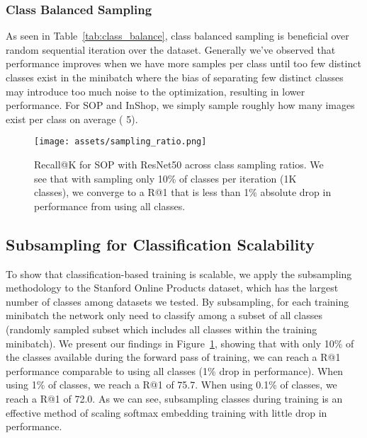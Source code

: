 \documentclass{bmvc2k}
\begin{document}
\subsubsection{Class Balanced Sampling}
\label{sec:class_balance_exp}
 As seen in Table~\ref{tab:class_balance}, class balanced sampling is beneficial over random sequential iteration over the dataset. Generally we've observed that performance improves when we have more samples per class until too few distinct classes exist in the minibatch where the bias of separating few distinct classes may introduce too much noise to the optimization, resulting in lower performance. For SOP and InShop, we simply sample roughly how many images exist per class on average ( 5).



  \begin{figure}
 \centering
 \texttt{[image: assets/sampling\_ratio.png]}
 \caption{Recall@K for SOP with ResNet50 across class sampling ratios. We see that with sampling only 10\% of classes per iteration (1K classes), we converge to a R@1 that is less than 1\% absolute drop in performance from using all classes.}
  \label{fig:sampling_ratio}
 \end{figure}

\subsection{Subsampling for Classification Scalability}
\label{sec:sampling_ratio}

To show that classification-based training is scalable, we apply the subsampling methodology to the Stanford Online Products dataset, which has the largest number of classes among datasets we tested. By subsampling, for each training minibatch the network only need to classify among a subset of all classes (randomly sampled subset which includes all classes within the training minibatch). We present our findings in Figure~\ref{fig:sampling_ratio}, showing that with only 10\% of the classes available during the forward pass of training, we can reach a R@1 performance comparable to using all classes (1\% drop in performance). When using 1\% of classes, we reach a R@1 of 75.7. When using 0.1\% of classes, we reach a R@1 of 72.0. As we can see, subsampling classes during training is an effective method of scaling softmax embedding training with little drop in performance.
\end{document}
